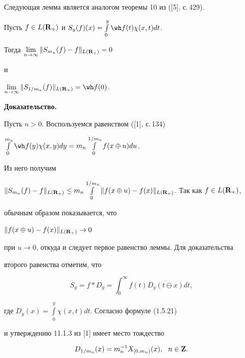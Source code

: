 Следующая лемма является аналогом теоремы 10 из ([5], с.\,429).








\begin{lems}


Пусть $f\in L({\bold R}_+)$ и $S_y(f)(x)=\int\limits^y_0{\wh f}(t)\chi(x,t)dt$. 


Тогда ${\lim\limits_{n\to\infty}\|S_{m_n}(f)-f\|_{L({\bold R}_+)}=0}$


и 


$\lim\limits_{n\to\infty}\|S_{1/m_n}(f)\|_{L({\bold R}_+)}={\wh f}(0)$.


\end{lems}








{\bf Доказательство.}


Пусть $n>0$. Воспользуемся равенством ([1], с.\,134) 


$\int\limits^{m_n}_0{\wh f}(y)\chi(x,y)dy=


m_n\int\limits^{1/m_n}_0f(x\oplus u)du$. 


Из него получим


$\|S_{m_n}(f)-f\|_{L({\bold R}_+)}\leq m_n\int\limits^{1/m_n}_0


\|f(x\oplus u)-f(x)\|_{L({\bold R}_+)}$. Так как $f\in L({\bold R}_+)$, 


обычным образом показывается, что


$\|f(x\oplus u)-f(x)\|_{L({\bold R}_+)}\to 0$ 


при $u\to 0$, откуда и следует первое равенство леммы. Для доказательства 


второго равенства отметим, что


\begin{equation*}


S_y=f*D_y=\int^{\infty}_0f(t)\overline {D_y(t\ominus x)}dt,


\end{equation*}


где $D_y(x)=\int\limits^y_0\chi(x,t)dt$. Согласно формуле (1.5.21)


и утверждению 11.1.3  из [1] имеет место тождество


\begin{equation}


D_{1/m_n}(x)=m_n^{-1}X_{[0,m_n)}(x),\ \ n\in {\bold Z}.


\end{equation}


